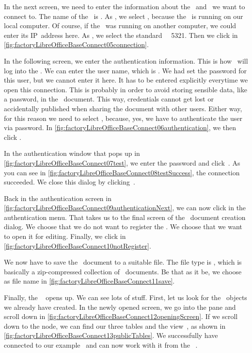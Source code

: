 In the next screen, we need to enter the information about the \dbms\ and \db\ we want to connect to.
The name of the \db\ is .
As \server, we select \localhost, because the \dbms\ is running on our local computer.
Of course, if the \dbms\ was running on another computer, we could enter its IP~address here.
As , we select the standard \postgresql\ ~5321.
Then we click  in \cref{fig:factoryLibreOfficeBaseConnect05connection}.

In the following screen, we enter the authentication information.
This is how \libreofficeBase\ will log into the \dbms.
We can enter the user name, which is .
We had set the password  for this user, but we cannot enter it here.
It has to be entered explicitly everytime we open this connection.
This is probably in order to avoid storing sensible data, like a password, in the \libreofficeBase\ document.
This way, credentials cannot get lost or accidentally published when sharing the document with other users.
Either way, for this reason we need to select , because, yes, we have to authenticate the user  via password.
In \cref{fig:factoryLibreOfficeBaseConnect06authentication}, we then click .

In the authentication window that pops up in \cref{fig:factoryLibreOfficeBaseConnect07test}, we enter the password  and click~.
As you can see in \cref{fig:factoryLibreOfficeBaseConnect08testSuccess}, the connection succeeded.
We close this dialog by clicking~.

Back in the authentication screen in \cref{fig:factoryLibreOfficeBaseConnect09authenticationNext}, we can now click  in the authentication menu.
That takes us to the final screen of the \db\ document creation dialog.
We choose that we do not want to register the \db.
We choose that we want to open it for editing.
Finally, we click  in \cref{fig:factoryLibreOfficeBaseConnect10notRegister}.

We now have to save the \libreofficeBase\ document to a suitable file.
The file type is , which is basically a zip-compressed collection of ~documents.
Be that as it be, we choose  as file name in \cref{fig:factoryLibreOfficeBaseConnect11save}.

Finally, the \db\  opens up.
We can see lots of stuff.
First, let us look for the \db\ objects we already have created.
In the newly opened screen, we go into the  pane and scroll down in \cref{fig:factoryLibreOfficeBaseConnect12openingScreen}.
If we scroll down to the  node, we can find our three tables and the view~, as shown in \cref{fig:factoryLibreOfficeBaseConnect13publicTables}.
We successfully have connected to our example \db\ and can now work with it from the \libreofficeBase\ .%
%
\FloatBarrier%
\endhsection%
%
